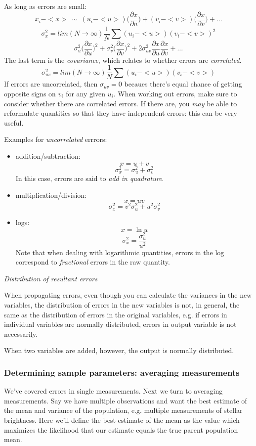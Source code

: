 \documentclass[12pt]{article}
\begin{document}
As long as errors are small:
    $$ x_i - <x> \ \sim \ 
        (u_i - <u>)\Bigg(\frac{\partial x}{\partial u}\Bigg)
       + (v_i - <v>)\Bigg( \frac{\partial x}{\partial v}  \Bigg)
       + \ldots  $$
    $$ \sigma_x^2 = lim(N \rightarrow \infty)\frac{1}{N}
       \sum(u_i - <u>)(v_i - <v>)^2 $$
    $$ \sigma_u^2\Bigg(\frac{\partial x}{\partial u}\Bigg)^2
       + \sigma_v^2\Bigg(\frac{\partial x}{\partial v}\Bigg)^2
       + 2\sigma_{uv}^2\frac{\partial x}{\partial u}
         \frac{\partial x}{\partial v} + \ldots $$
The last term is the \emph{covariance}, which relates to whether
errors are \emph{correlated}.
    $$ \sigma_{uv}^2 = lim(N \rightarrow\infty)\frac{1}{N}
       \sum(u_i - <u>)(v_i - <v>)  $$
If errors are uncorrelated, then $\sigma_{uv} = 0$ becaues there's
equal chance of getting opposite signs on $v_i$ for any given $u_i$.
When working out errors, make sure to consider whether there are
correlated errors. If there are, you \emph{may} be able to reformulate
quantities so that they have independent errors: this can be very
useful.

Examples for \emph{uncorrelated} errrors:
\begin{itemize}
    \item addition/subtraction:
        $$ x = u + v $$
        $$ \sigma_x^2 = \sigma_u^2 + \sigma_v^2 $$
        In this case, errors are said to \emph{add in quadrature}.
    \item multiplication/division:
        $$ x = uv $$
        $$ \sigma_x^2 = v^2\sigma_u^2 + u^2\sigma_v^2 $$
    \item logs:
        $$ x = \ln u $$
        $$ \sigma_x^2 = \frac{\sigma_u^2}{u^2} $$
        Note that when dealing with logarithmic quantities, errors in
        the log correspond to \emph{fractional} errors in the raw
        quantity. 
\end{itemize}

\emph{Distribution of resultant errors}

When propagating errors, even though you can calculate the variances
in the new variables, the distribution of errors in the new variables
is not, in general, the same as the distribution of errors in the
original variables, e.g. if errors in individual variables are
normally distributed, errors in output variable is not necessarily.

When two variables are added, however, the output is normally
distributed.

\subsubsection*{Determining sample parameters: averaging measurements}
We've covered errors in single measurements. Next we turn to averaging
measurements. Say we have multiple observations and want the best
estimate of the mean and variance of the population, e.g. multiple
measurements of stellar brightness. Here we'll define the best
estimate of the mean as the value which maximizes the likelihood that
our estimate equals the true parent population mean.
\end{document}
